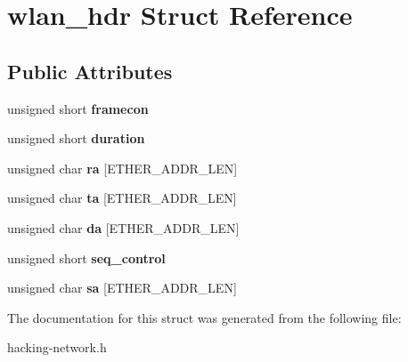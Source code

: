 \hypertarget{structwlan__hdr}{}\section{wlan\+\_\+hdr Struct Reference}
\label{structwlan__hdr}
\subsection*{Public Attributes}
\begin{DoxyCompactItemize}
\item 
unsigned short {\bfseries framecon}\hypertarget{structwlan__hdr_a246c63b452dccce486a8e9169352f544}{}\label{structwlan__hdr_a246c63b452dccce486a8e9169352f544}

\item 
unsigned short {\bfseries duration}\hypertarget{structwlan__hdr_a200a05f9ec5516916c4045c94f14c9ae}{}\label{structwlan__hdr_a200a05f9ec5516916c4045c94f14c9ae}

\item 
unsigned char {\bfseries ra} \mbox{[}E\+T\+H\+E\+R\+\_\+\+A\+D\+D\+R\+\_\+\+L\+EN\mbox{]}\hypertarget{structwlan__hdr_afc9d3d64050ee51b75e0c7366d394f66}{}\label{structwlan__hdr_afc9d3d64050ee51b75e0c7366d394f66}

\item 
unsigned char {\bfseries ta} \mbox{[}E\+T\+H\+E\+R\+\_\+\+A\+D\+D\+R\+\_\+\+L\+EN\mbox{]}\hypertarget{structwlan__hdr_ae2539d3f620fdd7b2919c4085604c409}{}\label{structwlan__hdr_ae2539d3f620fdd7b2919c4085604c409}

\item 
unsigned char {\bfseries da} \mbox{[}E\+T\+H\+E\+R\+\_\+\+A\+D\+D\+R\+\_\+\+L\+EN\mbox{]}\hypertarget{structwlan__hdr_a06071d966c04d8c2af4e03076afcb385}{}\label{structwlan__hdr_a06071d966c04d8c2af4e03076afcb385}

\item 
unsigned short {\bfseries seq\+\_\+control}\hypertarget{structwlan__hdr_ad88bc1e7729d9924bbbb49806a868fe7}{}\label{structwlan__hdr_ad88bc1e7729d9924bbbb49806a868fe7}

\item 
unsigned char {\bfseries sa} \mbox{[}E\+T\+H\+E\+R\+\_\+\+A\+D\+D\+R\+\_\+\+L\+EN\mbox{]}\hypertarget{structwlan__hdr_a92e14713106ce270e88a694473103dcb}{}\label{structwlan__hdr_a92e14713106ce270e88a694473103dcb}

\end{DoxyCompactItemize}


The documentation for this struct was generated from the following file\+:\begin{DoxyCompactItemize}
\item 
hacking-\/network.\+h\end{DoxyCompactItemize}
